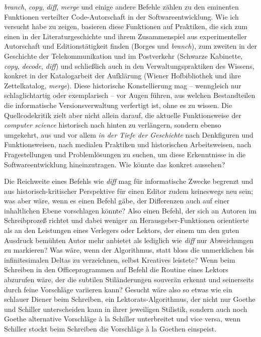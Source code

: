 \documentclass[a4paper,11pt]{article}
\begin{document}
\emph{branch}, \emph{copy}, \emph{diff}, \emph{merge} und einige andere Befehle zählen zu den eminenten Funktionen verteilter Code-Autorschaft in der Softwareentwicklung. Wie ich versucht habe zu zeigen, basieren diese Funktionen auf Praktiken, die sich zum einen in der Literaturgeschichte und ihrem Zusammenspiel aus experimenteller Autorschaft und Editionstätigkeit finden (Borges und \emph{branch}), zum zweiten in der Geschichte der Telekommunikation und im Postverkehr (Schwarze Kabinette, \emph{copy}, \emph{decode}, \emph{diff}) und schließlich auch in den Verwaltungspraktiken des Wissens, konkret in der Katalogarbeit der Aufklärung (Wiener Hofbibliothek und ihre Zettelkatalog, \emph{merge}). Diese historische Konstellierung mag – wenngleich nur schlaglichtartig oder exemplarisch – vor Augen führen, aus welchen Bestandteilen die informatische Versionsverwaltung verfertigt ist, ohne es zu wissen. Die Quellcodekritik zielt aber nicht allein darauf, die aktuelle Funktionsweise der \emph{computer science} historisch nach hinten zu verlängern, sondern ebenso umgekehrt, aus und vor allem \emph{in der Tiefe der Geschichte} nach Denkfiguren und Funktionsweisen, nach medialen Praktiken und historischen Arbeitsweisen, nach Fragestellungen und Problemlösungen zu suchen, um diese Erkenntnisse in die Softwareentwicklung hineinzutragen. Wie könnte das konkret aussehen? 

Die Reichweite eines Befehls wie \emph{diff} mag für informatische Zwecke begrenzt und aus historisch-kritischer Perspektive für einen Editor zudem keineswegs neu sein; was aber wäre, wenn es einen Befehl gäbe, der Differenzen auch auf einer inhaltlichen Ebene vorschlagen könnte? Also einen Befehl, der sich an Autoren im Schreibprozeß richtet und dabei weniger an Herausgeber-Funktionen orientierte als an den Leistungen eines Verlegers oder Lektors, der einem um den guten Ausdruck bemühten Autor mehr anbietet als lediglich wie \emph{diff} nur Abweichungen zu markieren? Was wäre, wenn der Algorithmus, statt bloss die unmerklichen bis infinitesimalen Deltas zu verzeichnen, selbst Kreatives leistete? Wenn beim Schreiben in den Officeprogrammen auf Befehl die Routine eines Lektors abzurufen wäre, der die subtilen Stiländerungen souverän erkennt und seinerseits durch feine Vorschläge variieren kann? Gesucht wäre also so etwas wie ein schlauer Diener beim Schreiben, ein Lektorats-Algorithmus, der nicht nur Goethe und Schiller unterscheiden kann in ihrer jeweiligen Stilistik, sondern auch noch Goethe alternative Vorschläge à la Schiller unterbreitet und vice versa, wenn Schiller stockt beim Schreiben die Vorschläge à la Goethen einspeist.
\end{document}
